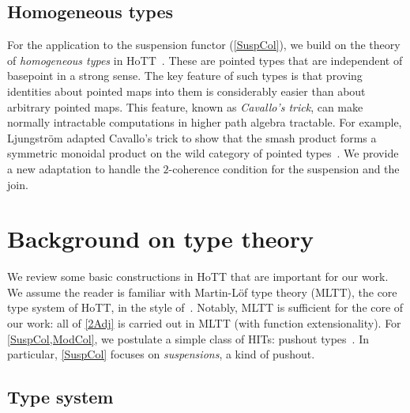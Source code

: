 \subsection{Homogeneous types}

For the application to the suspension functor (\autoref{SuspCol}), we build on the theory of \emph{homogeneous types} in HoTT~\cite[Section 2]{banded}. These are pointed types that are independent of basepoint in a strong sense. The key feature of such types is that proving identities about pointed maps into them is considerably easier than about arbitrary pointed maps. This feature, known as \emph{Cavallo's trick}, can make normally intractable computations in higher path algebra tractable. For example, Ljungstr\"om adapted Cavallo's trick to show that the smash product forms a symmetric monoidal product on the wild category of pointed types~\cite{smashmon}. We provide a new adaptation to handle the $2$-coherence condition for the suspension and the join.

\section{Background on type theory}\label{Backg}

We review some basic constructions in HoTT that are important for our work. We assume the reader is familiar with Martin-L\"of type theory (MLTT), the core type system of HoTT, in the style of~\cite{Uni13}. Notably, MLTT is sufficient for the core of our work: all of \autoref{2Adj} is carried out in MLTT (with function extensionality). For \cref{SuspCol,ModCol}, we postulate a simple class of HITs: pushout types~\cite[Section 6.8]{Uni13}. In particular, \autoref{SuspCol} focuses on \emph{suspensions}, a kind of pushout.

\subsection{Type system}

